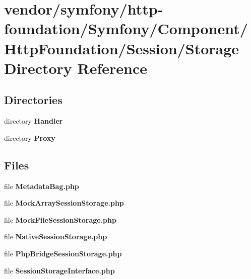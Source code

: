 \section{vendor/symfony/http-\/foundation/\+Symfony/\+Component/\+Http\+Foundation/\+Session/\+Storage Directory Reference}
\label{dir_17fed6b26ba0ee82708e252395be3d64}
\subsection*{Directories}
\begin{DoxyCompactItemize}
\item 
directory {\bf Handler}
\item 
directory {\bf Proxy}
\end{DoxyCompactItemize}
\subsection*{Files}
\begin{DoxyCompactItemize}
\item 
file {\bf Metadata\+Bag.\+php}
\item 
file {\bf Mock\+Array\+Session\+Storage.\+php}
\item 
file {\bf Mock\+File\+Session\+Storage.\+php}
\item 
file {\bf Native\+Session\+Storage.\+php}
\item 
file {\bf Php\+Bridge\+Session\+Storage.\+php}
\item 
file {\bf Session\+Storage\+Interface.\+php}
\end{DoxyCompactItemize}

